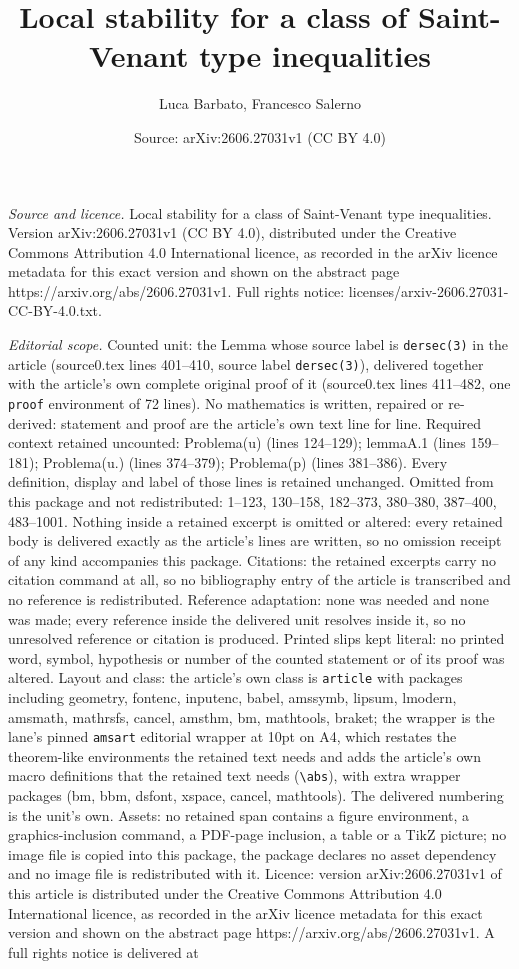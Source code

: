 \documentclass[10pt,a4paper]{amsart}
\title[Local stability for a class of Saint-Venant type inequalitie]{Local stability for a class of Saint-Venant type inequalities}
\author{Luca Barbato, Francesco Salerno}
\date{Source: arXiv:2606.27031v1 (CC BY 4.0)}
\begin{document}
\maketitle

\noindent\emph{Source and licence.} Local stability for a class of Saint-Venant type inequalities. Version arXiv:2606.27031v1 (CC BY 4.0), distributed under the Creative Commons Attribution 4.0 International licence, as recorded in the arXiv licence metadata for this exact version and shown on the abstract page https://arxiv.org/abs/2606.27031v1. Full rights notice: licenses/arxiv-2606.27031-CC-BY-4.0.txt.\par\smallskip

\noindent\textit{Editorial scope.} Counted unit: the Lemma whose source label is \texttt{dersec(3)} in the article (source0.tex lines 401--410, source label \texttt{dersec(3)}), delivered together with the article's own complete original proof of it (source0.tex lines 411--482, one \texttt{proof} environment of 72 lines). No mathematics is written, repaired or re-derived: statement and proof are the article's own text line for line. Required context retained uncounted: Problema(u) (lines 124--129); lemmaA.1 (lines 159--181); Problema(u.) (lines 374--379); Problema(p) (lines 381--386). Every definition, display and label of those lines is retained unchanged. Omitted from this package and not redistributed: 1--123, 130--158, 182--373, 380--380, 387--400, 483--1001. Nothing inside a retained excerpt is omitted or altered: every retained body is delivered exactly as the article's lines are written, so no omission receipt of any kind accompanies this package. Citations: the retained excerpts carry no citation command at all, so no bibliography entry of the article is transcribed and no reference is redistributed. Reference adaptation: none was needed and none was made; every reference inside the delivered unit resolves inside it, so no unresolved reference or citation is produced. Printed slips kept literal: no printed word, symbol, hypothesis or number of the counted statement or of its proof was altered. Layout and class: the article's own class is \texttt{article} with packages including geometry, fontenc, inputenc, babel, amssymb, lipsum, lmodern, amsmath, mathrsfs, cancel, amsthm, bm, mathtools, braket; the wrapper is the lane's pinned \texttt{amsart} editorial wrapper at 10pt on A4, which restates the theorem-like environments the retained text needs and adds the article's own macro definitions that the retained text needs (\texttt{\textbackslash abs}), with extra wrapper packages (bm, bbm, dsfont, xspace, cancel, mathtools). The delivered numbering is the unit's own. Assets: no retained span contains a figure environment, a graphics-inclusion command, a PDF-page inclusion, a table or a TikZ picture; no image file is copied into this package, the package declares no asset dependency and no image file is redistributed with it. Licence: version arXiv:2606.27031v1 of this article is distributed under the Creative Commons Attribution 4.0 International licence, as recorded in the arXiv licence metadata for this exact version and shown on the abstract page https://arxiv.org/abs/2606.27031v1. A full rights notice is delivered at 
\end{document}
